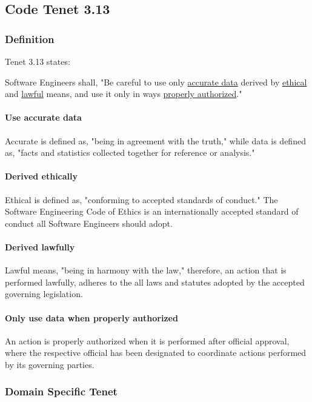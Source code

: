 \documentclass[12pt]{article}
\begin{document}
\begin{multicols}{2}
\subsection{Code Tenet 3.13}

\subsubsection{Definition}

Tenet 3.13  states:
\begin{framed}
Software Engineers shall, "Be careful to use only \ul{accurate data} derived by \ul{ethical} and \ul{lawful} means, and use it only in ways \ul{properly authorized}."\cite{softwareEngineeringCodeOfEthics}
\end{framed}

\paragraph{Use accurate data}
Accurate is defined as, "being in agreement with the truth," while data is defined as, "facts and statistics collected together for reference or analysis."\cite{accurateDefinition}\cite{dataDefinition}

\paragraph{Derived ethically}
Ethical is defined as, "conforming to accepted standards of conduct."\cite{ethicalDefinition} The Software Engineering Code of Ethics is an internationally accepted standard of conduct all Software Engineers should adopt.

\paragraph{Derived lawfully}
Lawful means, "being in harmony with the law," therefore, an action that is performed lawfully, adheres to the all laws and statutes adopted by the accepted governing legislation.\cite{lawfulDefinition}

\paragraph{Only use data when properly authorized}
An action is properly authorized when it is performed after official approval, where the respective official has been designated to coordinate actions performed by its governing parties.

\subsubsection{Domain Specific Tenet}


\end{multicols}
\end{document}
